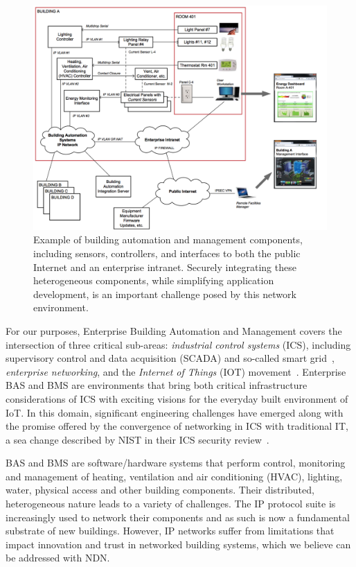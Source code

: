\begin{figure}
\vskip -12pt
\includegraphics[width=.6\textwidth]{figures/BAS-Figure}
\vskip -5pt
\caption{{Example of building automation and management components, including sensors, controllers, and interfaces to both the public Internet and an enterprise intranet.  Securely integrating these heterogeneous components, while simplifying application development, is an important challenge posed by this network environment.}}
\label{fig:BAS}
\end{figure}

For our purposes, Enterprise Building Automation and Management covers the intersection of three critical sub-areas: \emph{industrial control systems} (ICS), including supervisory control and data acquisition (SCADA) and so-called smart grid~\cite{fang2011smart}, \emph{enterprise networking}, and the \emph{Internet of Things} (IOT) movement~\cite{atzori2010internet}. Enterprise BAS and BMS are environments that bring both critical infrastructure considerations of ICS with exciting visions for the everyday built environment of IoT.  In this domain, significant engineering challenges have emerged along with the promise offered by the convergence of networking in ICS with traditional IT, a sea change described by NIST in their ICS security review~\cite{NIST_ICS}.  

BAS and BMS are software/hardware systems that perform control, monitoring and management of heating, ventilation and air conditioning (HVAC), lighting, water, physical access and other building components. Their distributed, heterogeneous nature leads to a variety of challenges.  The IP protocol suite is increasingly used to network their components and as such is now a fundamental substrate of new buildings. However, IP networks suffer from limitations that impact innovation and trust in networked building systems, which we believe can be addressed with NDN.    
 

